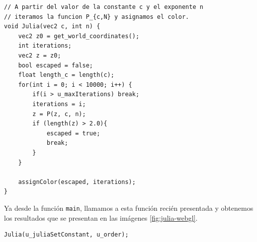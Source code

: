 \begin{lstlisting}
// A partir del valor de la constante c y el exponente n
// iteramos la funcion P_{c,N} y asignamos el color.
void Julia(vec2 c, int n) {
    vec2 z0 = get_world_coordinates();
    int iterations;
    vec2 z = z0;
    bool escaped = false;
    float length_c = length(c);
    for(int i = 0; i < 10000; i++) {
        if(i > u_maxIterations) break;
        iterations = i;
        z = P(z, c, n);
        if (length(z) > 2.0){
            escaped = true;
            break;
        }
    }

    assignColor(escaped, iterations);
}
\end{lstlisting}

Ya desde la función \verb|main|, llamamos a esta función recién presentada y obtenemos los resultados que se presentan en las imágenes \ref{fig:julia-webgl}.  

\begin{lstlisting}
Julia(u_juliaSetConstant, u_order);
\end{lstlisting}

